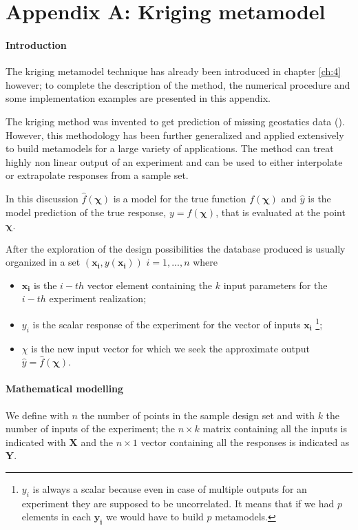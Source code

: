 \chapter*{Appendix A: Kriging metamodel}

\subsubsection{Introduction}
The kriging metamodel technique has already been introduced in chapter \ref{ch:4} however; to complete the description of the method, the numerical procedure and some implementation examples are presented in this appendix.

The kriging method was invented to get prediction of missing geostatics data (\citet{krige1951statistical}). However, this methodology has been further generalized and applied extensively to build metamodels for a large variety of applications.
The method can treat highly non linear output of an experiment and can be used to either interpolate or extrapolate responses from a sample set.

In this discussion $\hat{f}(\boldsymbol{\chi})$ is a model for the true function $f(\boldsymbol{\chi})$ and $\hat{y}$ is the model prediction of the true response, $y = f(\boldsymbol{\chi})$, that is evaluated at the point $\boldsymbol{\chi}$. 

After the exploration of the design possibilities the database produced is usually organized in a set $(\mathbf{x_i}, y(\mathbf{x_i}))$  $i=1,...,n$ where
\begin{itemize}
	\item $\mathbf{x_i}$ is the $i-th$ vector element containing the $k$ input parameters for the $i-th$ experiment realization;
	\item $y_i$ is the scalar response of the experiment for the vector of inputs $\mathbf{x_i}$ \footnote{$y_i$ is always a scalar because even in case of multiple outputs for an experiment they are supposed to be uncorrelated. It means that if we had $p$ elements in each $\mathbf{y_i}$ we would have to build $p$ metamodels.};
	\item $\chi$ is the new input vector for which we seek the approximate output $\hat{y}=\hat{f}(\boldsymbol{\chi})$.
\end{itemize}

\subsubsection{Mathematical modelling}
We define with $n$ the number of points in the sample design set and with $k$ the number of inputs of the experiment; the $n \times k$ matrix containing all the inputs is indicated with $\mathbf{X}$ and the $n \times 1$ vector containing all the responses is indicated as $\mathbf{Y}$.

